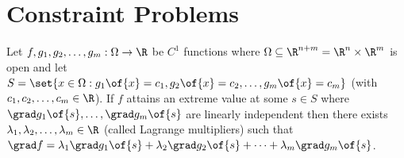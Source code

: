 \chapter{Constraint Problems}


\begin{theorem}
    Let $f, g_1, g_2, \dots, g_m: \Omega \to \R$ be $C^1$ functions where $\Omega \subseteq \R^{n+m} = \R^n \times \R^m$ is open and let $S = \set{x \in \Omega: g_1\of{x} = c_1, g_2\of{x} = c_2, \dots, g_m\of{x} = c_m}$ (with $c_1, c_2, \dots, c_m \in \R$). If $f$ attains an extreme value at some $s \in S$ where $\grad g_1\of{s}, \dots, \grad g_m \of{s}$ are linearly independent then there exists $\lambda_1, \lambda_2, \dots, \lambda_m \in \R$ (called Lagrange multipliers) such that $\grad f = \lambda_1 \grad g_1\of{s} + \lambda_2 \grad g_2\of{s} + \cdots + \lambda_m \grad g_m\of{s}$.
\end{theorem}
